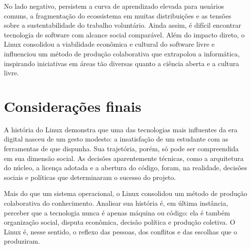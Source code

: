 \documentclass[12pt]{article}
\begin{document}
No lado negativo, persistem a curva de aprendizado elevada para usuários comuns,
a fragmentação do ecossistema em muitas distribuições e as tensões sobre a
sustentabilidade do trabalho voluntário. Ainda assim, é difícil encontrar
tecnologia de software com alcance social comparável. Além do impacto direto, o
Linux consolidou a viabilidade econômica e cultural do software livre e
influenciou um método de produção colaborativa que extrapolou a informática,
inspirando iniciativas em áreas tão diversas quanto a ciência aberta e a cultura
livre.

\section{Considerações finais}

A história do Linux demonstra que uma das tecnologias mais influentes da era
digital nasceu de um gesto modesto: a insatisfação de um estudante com as
ferramentas de que dispunha. Sua trajetória, porém, só pode ser compreendida em
sua dimensão social. As decisões aparentemente técnicas, como a arquitetura do
núcleo, a licença adotada e a abertura do código, foram, na realidade, decisões
sociais e políticas que determinaram o sucesso do projeto.

Mais do que um sistema operacional, o Linux consolidou um método de produção
colaborativa do conhecimento. Analisar sua história é, em última instância,
perceber que a tecnologia nunca é apenas máquina ou código: ela é também
organização social, disputa econômica, decisão política e produção coletiva. O
Linux é, nesse sentido, o reflexo das pessoas, dos conflitos e das escolhas que o
produziram.



\end{document}
